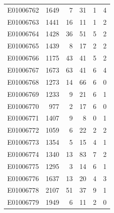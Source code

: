 \documentclass[
  letterpaper,
  DIV=11,
  numbers=noendperiod]{scrreprt}
\begin{document}
\begin{tabular}{lrrrrr}
E01006762     &    1649 &       7 &                    31 &                               1 &                       4 \\
E01006763     &    1441 &      16 &                    11 &                               1 &                       2 \\
E01006764     &    1428 &      36 &                    51 &                               5 &                       2 \\
E01006765     &    1439 &       8 &                    17 &                               2 &                       2 \\
E01006766     &    1175 &      43 &                    41 &                               5 &                       2 \\
E01006767     &    1673 &      63 &                    41 &                               6 &                       4 \\
E01006768     &    1273 &      14 &                    66 &                               6 &                       0 \\
E01006769     &    1233 &       9 &                    21 &                               6 &                       1 \\
E01006770     &     977 &       2 &                    17 &                               6 &                       0 \\
E01006771     &    1407 &       9 &                     8 &                               0 &                       1 \\
E01006772     &    1059 &       6 &                    22 &                               2 &                       2 \\
E01006773     &    1354 &       5 &                    15 &                               4 &                       1 \\
E01006774     &    1340 &      13 &                    83 &                               7 &                       2 \\
E01006775     &    1295 &       3 &                    14 &                               6 &                       1 \\
E01006776     &    1637 &      13 &                    20 &                               4 &                       3 \\
E01006778     &    2107 &      51 &                    37 &                               9 &                       1 \\
E01006779     &    1949 &       6 &                    11 &                               2 &                       0 \\

\end{tabular}
\end{document}
